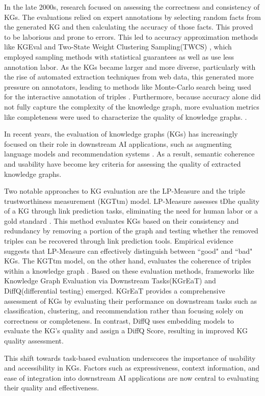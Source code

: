 In the late 2000s, research focused on assessing the correctness and consistency of KGs. The evaluations relied on expert annotations by selecting random facts from the generated KG and then calculating the accuracy of those facts. \citep{yago} This proved to be laborious and prone to errors. This led to accuracy approximation methods like KGEval \citep{ojha-talukdar-2017-kgeval} and Two-State Weight Clustering Sampling(TWCS) \citep{gao2018efficientKGeval}, which employed sampling methods with statistical guarantees as well as use less annotation labor. As the KGs became larger and more diverse, particularly with the rise of automated extraction techniques from web data, this generated more pressure on annotators, leading to methods like Monte-Carlo search being used for the interactive annotation of triples \citep{qi2022optimizedhumancollab}. Furthermore, because accuracy alone did not fully capture the complexity of the knowledge graph, more evaluation metrics like completeness were used to characterize the quality of knowledge graphs. \citep{SubhiIssaKnowledgeGraphCompleteness}. 


In recent years, the evaluation of knowledge graphs (KGs) has increasingly focused on their role in downstream AI applications, such as augmenting language models \citep{decadeofkginnlp} and recommendation systems \citep{he2020lightgcn}. As a result, semantic coherence and usability have become key criteria for assessing the quality of extracted knowledge graphs.

Two notable approaches to KG evaluation are the LP-Measure and the triple trustworthiness measurement (KGTtm) model. LP-Measure assesses tDhe quality of a KG through link prediction tasks, eliminating the need for human labor or a gold standard \citep{zhu2023assessing}. This method evaluates KGs based on their consistency and redundancy by removing a portion of the graph and testing whether the removed triples can be recovered through link prediction tools. Empirical evidence suggests that LP-Measure can effectively distinguish between ``good" and ``bad" KGs. The KGTtm model, on the other hand, evaluates the coherence of triples within a knowledge graph \cite{jia2019triple}. Based on these evaluation methods, frameworks like Knowledge Graph Evaluation via Downstream Tasks(KGrEaT) and DiffQ(differential testing) emerged. KGrEaT provides a comprehensive assessment of KGs by evaluating their performance on downstream tasks such as classification, clustering, and recommendation \citep{heist2023kgreat} rather than focusing solely on correctness or completeness. In contrast, DiffQ uses embedding models to evaluate the KG's quality and assign a DiffQ Score, resulting in improved KG quality assessment. \cite{tan2024diffq} 

This shift towards task-based evaluation underscores the importance of usability and accessibility in KGs. Factors such as expressiveness, context information, and ease of integration into downstream AI applications are now central to evaluating their quality and effectiveness.